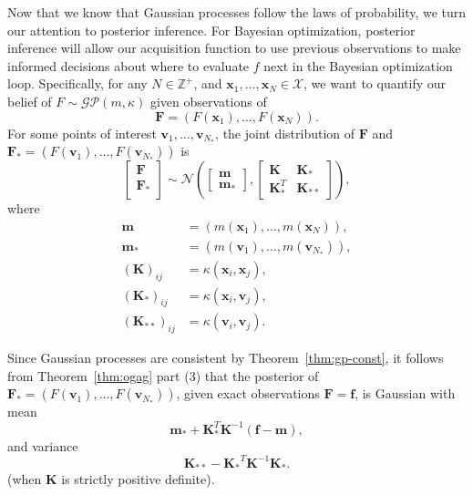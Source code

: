 Now that we know that Gaussian processes follow the laws of probability, we turn our attention to posterior inference.
For Bayesian optimization, posterior inference will allow our acquisition function to use previous observations to make informed decisions about where to evaluate $f$ next in the Bayesian optimization loop.
Specifically, for any $N \in \mathbb{Z}^{+}$, and $\mathbf{x}_1, \dots, \mathbf{x}_N \in \mathcal{X}$, we want to quantify our belief of $F \sim \mathcal{GP}(m, \kappa)$
given observations of
\begin{equation*}
    \mathbf{F} = (F(\mathbf{x}_1), \dots, F(\mathbf{x}_N)).
\end{equation*}
For some points of interest $\mathbf{v}_{1}, \dots, \mathbf{v}_{N_{*}}$,
the joint distribution of $\mathbf{F}$ and $\mathbf{F}_* = (F(\mathbf{v}_1), \dots, F(\mathbf{v}_{N_*}))$ is
\begin{equation*}
    \begin{bmatrix}
        \mathbf{F} \\
        \mathbf{F}_{*} \\
    \end{bmatrix}
    \sim
    \mathcal{N}\left(
    \begin{bmatrix}
            \mathbf{m} \\
            \mathbf{m}_{*}
        \end{bmatrix}
    ,
    \begin{bmatrix}
            \mathbf{K} & \mathbf{K}_* \\
            \mathbf{K}_*^T & \mathbf{K}_{* *}
        \end{bmatrix}
    \right),
\end{equation*}
where
\begin{align*}
    \mathbf{m} & = (m(\mathbf{x}_1), \dots, m(\mathbf{x}_N)), \\
    \mathbf{m_*} & = (m(\mathbf{v}_1), \dots, m(\mathbf{v}_{N_{*}})), \\
    (\mathbf{K})_{ij} & = \kappa(\mathbf{x}_i, \mathbf{x}_j), \\
    (\mathbf{K}_*)_{ij} & = \kappa(\mathbf{x}_i, \mathbf{v}_j), \\
    (\mathbf{K}_{* *})_{ij} & = \kappa(\mathbf{v}_i, \mathbf{v}_j).
\end{align*}

Since Gaussian processes are consistent by Theorem~\ref{thm:gp-const}, it follows from Theorem~\ref{thm:ogag} part (3) that the posterior
of $\mathbf{F}_* = (F(\mathbf{v}_1), \dots, F(\mathbf{v}_{N_*}))$, given exact observations $\mathbf{F} = \mathbf{f}$, is Gaussian with mean
\begin{equation}
    \label{eq:noisless-post-mean}
    \mathbf{m}_* + \mathbf{K}_*^T \mathbf{K}^{-1} (\mathbf{f} - \mathbf{m}),
\end{equation}
and variance
\begin{equation}
    \label{eq:noiseless-post-var}
    \mathbf{K}_{* *} - \mathbf{K_*}^{T} \mathbf{K}^{-1} \mathbf{K_*}.
\end{equation}
(when $\mathbf{K}$ is strictly positive definite).

